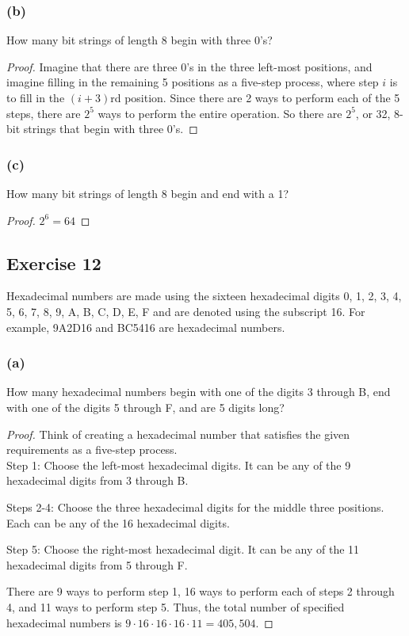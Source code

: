 \documentclass[14pt]{extarticle}
\newcommand{\cy}{\color{cyan}}
\begin{document}
\subsubsection{(b)}
How many bit strings of length 8 begin with three 0’s?

\begin{proof}
Imagine that there are three 0’s in the three left-most positions, and imagine filling in the remaining 5 positions 
as a five-step process, where step $i$ is to fill in the \((i + 3)\)rd position. Since there are 2 ways to perform 
each of the 5 steps, there are \(2^5\) ways to perform the entire operation. So there are \(2^5\), or 32, 8-bit 
strings that begin with three 0’s.
\end{proof}

\subsubsection{(c)}
How many bit strings of length 8 begin and end with a 1?

\begin{proof}
\(2^6 = 64\)
\end{proof}

\subsection{Exercise 12}
Hexadecimal numbers are made using the sixteen hexadecimal digits 0, 1, 2, 3, 4, 5, 6, 7, 8, 9, A, B, C, D, E, F and 
are denoted using the subscript 16. For example, 9A2D16 and BC5416 are hexadecimal numbers.

\subsubsection{(a)}
How many hexadecimal numbers begin with one of the digits 3 through B, end with one of the digits 5 through F, and are 
5 digits long?

\begin{proof}
Think of creating a hexadecimal number that satisfies the given requirements as a five-step process. \\
{\cy Step 1:} Choose the left-most hexadecimal digits. It can be any of the 9 hexadecimal digits from 3 through B.

{\cy Steps 2-4:} Choose the three hexadecimal digits for the middle three positions. Each can be any of the 16 
hexadecimal digits.

{\cy Step 5:} Choose the right-most hexadecimal digit. It can be any of the 11 hexadecimal digits from 5 through F.

There are 9 ways to perform step 1, 16 ways to perform each of steps 2 through 4, and 11 ways to perform step 5. Thus, 
the total number of specified hexadecimal numbers is \(9 \cdot 16 \cdot 16 \cdot 16 \cdot 11 = 405,504\).
\end{proof}
\end{document}
